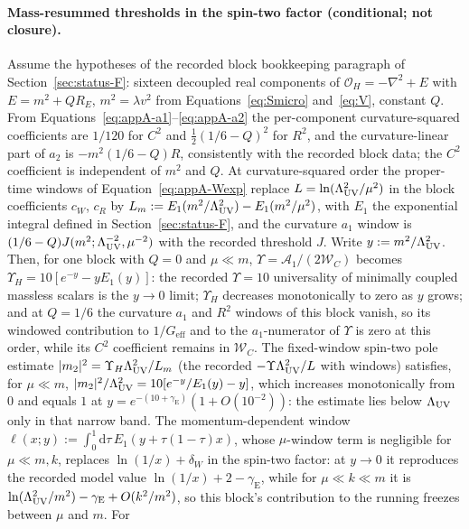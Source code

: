 \paragraph{Mass-resummed thresholds in the spin-two factor
(conditional; not closure).}
Assume the hypotheses of the recorded block bookkeeping paragraph of
Section~\ref{sec:status-F}: sixteen decoupled real components of
\(\mathcal O_H=-\nabla^2+E\) with \(E=m^2+Q R_E\),
\(m^2=\lambda v^2\) from Equations~\eqref{eq:Smicro} and~\eqref{eq:V},
constant \(Q\). From Equations~\eqref{eq:appA-a1}--\eqref{eq:appA-a2}
the per-component curvature-squared coefficients are \(1/120\) for
\(C^2\) and \(\tfrac12(1/6-Q)^2\) for \(R^2\), and the
curvature-linear part of \(a_2\) is \(-m^2(1/6-Q)R\), consistently
with the recorded block data; the \(C^2\) coefficient is independent
of \(m^2\) and \(Q\). At curvature-squared order the
proper-time windows of Equation~\eqref{eq:appA-Wexp} replace
\(L=\ln(\Lambda_{\mathrm{UV}}^2/\mu^2)\) in the block coefficients \(c_W\), \(c_R\) by
\(L_m:=E_1(m^2/\Lambda_{\mathrm{UV}}^2)-E_1(m^2/\mu^2)\), with \(E_1\) the
exponential integral defined in Section~\ref{sec:status-F}, and the
curvature \(a_1\) window is \((1/6-Q)J(m^2;\Lambda_{\mathrm{UV}}^{-2},\mu^{-2})\) with
the recorded threshold \(J\). Write \(y:=m^2/\Lambda_{\mathrm{UV}}^2\). Then, for one
block with \(Q=0\) and \(\mu\ll m\),
\(\Upsilon=\mathcal A_1/(2\mathcal W_C)\) becomes
\(\Upsilon_H=10[e^{-y}-yE_1(y)]\): the recorded \(\Upsilon=10\)
universality of minimally coupled massless scalars is the \(y\to0\)
limit; \(\Upsilon_H\) decreases monotonically to zero as \(y\) grows;
and at \(Q=1/6\) the curvature \(a_1\) and \(R^2\) windows of this
block vanish, so its windowed contribution to \(1/G_{\mathrm{eff}}\) and to
the \(a_1\)-numerator of \(\Upsilon\) is zero at this order, while its
\(C^2\) coefficient remains in \(\mathcal W_C\). The fixed-window spin-two
pole estimate
\(|m_2|^2=\Upsilon_H\Lambda_{\mathrm{UV}}^2/L_m\) (the recorded
\(-\Upsilon\Lambda_{\mathrm{UV}}^2/L\) with windows) satisfies, for \(\mu\ll m\),
\(|m_2|^2/\Lambda_{\mathrm{UV}}^2=10[e^{-y}/E_1(y)-y]\), which increases
monotonically from \(0\) and equals \(1\) at
\(y=e^{-(10+\gamma_{\mathrm E})}(1+O(10^{-2}))\): the estimate lies
below \(\Lambda_{\mathrm{UV}}\) only in that narrow band. The momentum-dependent
window \(\ell(x;y):=\int_0^1\mathrm{d}\tau\,
E_1(y+\tau(1-\tau)x)\), whose \(\mu\)-window term is negligible for
\(\mu\ll m,k\), replaces \(\ln(1/x)+\delta_W\) in the spin-two
factor: at \(y\to0\) it reproduces the recorded model value
\(\ln(1/x)+2-\gamma_{\mathrm E}\), while for \(\mu\ll k\ll m\) it is
\(\ln(\Lambda_{\mathrm{UV}}^2/m^2)-\gamma_{\mathrm E}+O(k^2/m^2)\), so this block's
contribution to the running freezes between \(\mu\) and \(m\). For
